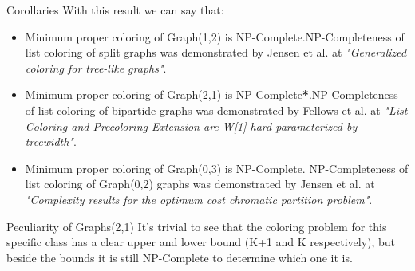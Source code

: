 \documentclass[9pt, compress]{beamer}
\begin{document}
    \begin{frame}{Corollaries}
      With this result we can say that:
      \begin{itemize}
        \item Minimum proper coloring of Graph(1,2) is NP-Complete.\newline NP-Completeness of list coloring of split graphs was demonstrated by Jensen et al. at \textit{"Generalized coloring for tree-like graphs"}.
        \item Minimum proper coloring of Graph(2,1) is NP-Complete\textbf{*}.\newline NP-Completeness of list coloring of bipartide graphs was demonstrated by Fellows et al. at \textit{"List Coloring and Precoloring Extension are W[1]-hard parameterized by treewidth"}.
        \item Minimum proper coloring of Graph(0,3) is NP-Complete.
        \newline NP-Completeness of list coloring of Graph(0,2) graphs was demonstrated by Jensen et al. at \textit{"Complexity results for the optimum cost chromatic partition problem"}.
      \end{itemize}
    \end{frame}
    \begin{frame}{ Peculiarity of Graphs(2,1) }
      It's trivial to see that the coloring problem for this specific class has a clear upper and lower bound (K+1 and K respectively), but beside the bounds it is still NP-Complete to determine which one it is.
    \end{frame}
\end{document}
